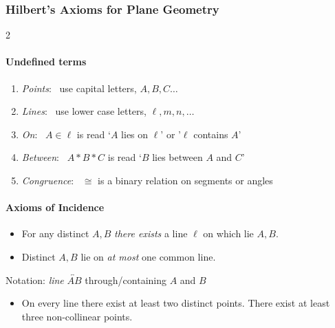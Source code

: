 \clearpage



\subsubsection*{\centering \large Hilbert's Axioms for Plane Geometry}\label{pg:hilbertaxioms}

\enlargethispage\baselineskip
\vspace{-2pt}
\columnsep 12pt
\begin{multicols}{2}

	\paragraph{Undefined terms}
	\begin{enumerate}\itemsep2pt
	  \item \emph{Points}: \ use capital letters, $A,B,C\ldots$
	  \item \emph{Lines}: \ use lower case letters, $\ell,m,n,\ldots$
	  \item \emph{On}: \ $A\in\ell$ is read `$A$ lies on $\ell$' or '$\ell$ contains $A$'
	  \item \emph{Between}: \ $A*B*C$ is read `$B$ lies between $A$ and $C$'
	  \item \emph{Congruence}: \ $\cong$ is a binary relation on segments or angles
	\end{enumerate}
	
	
	\paragraph{Axioms of Incidence}
	
	\begin{itemize}\itemsep2pt
		\item[I-1] For any distinct $A,B$ \emph{there exists} a line $\ell$ on which lie $A,B$.
		\item[I-2] Distinct $A,B$ lie on \emph{at most} one common line.
	\end{itemize}\vspace{-2pt}
		
	Notation: \emph{line} $\overleftrightarrow{AB}$ through/containing $A$ and $B$\vspace{-2pt}
	
	\begin{itemize}
		\item[I-3] On every line there exist at least two distinct points. There exist at least three non-collinear points.
	\end{itemize}
	

\end{multicols}
